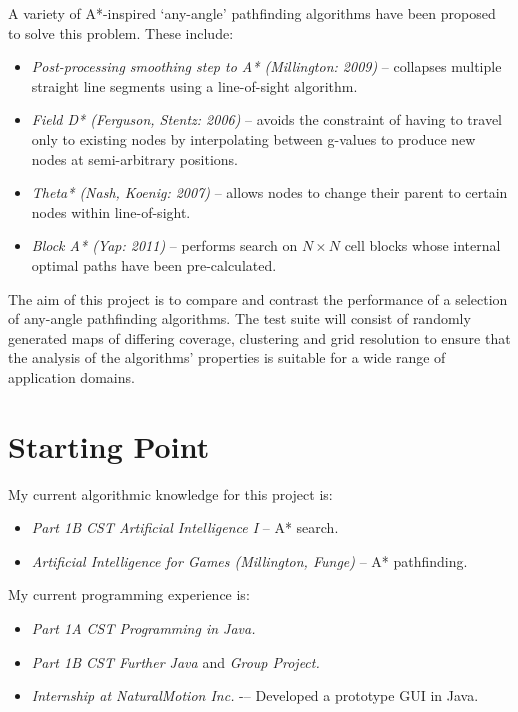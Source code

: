 \noindent
A variety of A*-inspired `any-angle' pathfinding algorithms have been proposed to solve this problem. These include:
\begin{itemize}
\item {\em Post-processing smoothing step to A* (Millington: 2009)} -- collapses multiple straight line segments using a line-of-sight algorithm.
\item {\em Field D* (Ferguson, Stentz: 2006)} -- avoids the constraint of having to travel only to existing nodes by interpolating between g-values to produce new nodes at semi-arbitrary positions.
\item {\em Theta* (Nash, Koenig: 2007)} -- allows nodes to change their parent to certain nodes within line-of-sight.  
\item {\em Block A* (Yap: 2011)} -- performs search on  $N \times N$ cell blocks whose internal optimal paths have been pre-calculated.
\end{itemize}

\noindent
The aim of this project is to compare and contrast the performance of a selection of any-angle pathfinding algorithms. The test suite will consist of randomly generated maps of differing coverage, clustering and grid resolution to ensure that the analysis of the algorithms' properties is suitable for a wide range of application domains.

\vfil

\section*{Starting Point}

My current algorithmic knowledge for this project is:

\begin{itemize}
\item {\em Part 1B CST Artificial Intelligence I} -- A* search.
\item {\em Artificial Intelligence for Games (Millington, Funge)} -- A* pathfinding. 
\end{itemize}

My current programming experience is:

\begin{itemize}
\item {\em Part 1A CST Programming in Java.}
\item {\em Part 1B CST Further Java} and {\em Group Project.}
\item {\em Internship at NaturalMotion Inc.} -– Developed a prototype GUI in Java.
\end{itemize}

